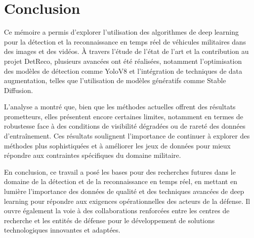 \chapter*{Conclusion}
\label{chap:conclusion}
\sloppy

Ce mémoire a permis d'explorer l'utilisation des algorithmes de deep learning pour la détection et la reconnaissance en temps réel de véhicules militaires dans des images et des vidéos.
À travers l'étude de l'état de l'art et la contribution au projet DetReco, plusieurs avancées ont été réalisées, notamment l'optimisation des modèles de détection comme YoloV8 et l'intégration de techniques de data augmentation, telles que l'utilisation de modèles génératifs comme Stable Diffusion.

L'analyse a montré que, bien que les méthodes actuelles offrent des résultats prometteurs, elles présentent encore certaines limites, notamment en termes de robustesse face à des conditions de visibilité dégradées ou de rareté des données d'entraînement.
Ces résultats soulignent l'importance de continuer à explorer des méthodes plus sophistiquées et à améliorer les jeux de données pour mieux répondre aux contraintes spécifiques du domaine militaire.

En conclusion, ce travail a posé les bases pour des recherches futures dans le domaine de la détection et de la reconnaissance en temps réel, en mettant en lumière l'importance des données de qualité et des techniques avancées de deep learning pour répondre aux exigences opérationnelles des acteurs de la défense.
Il ouvre également la voie à des collaborations renforcées entre les centres de recherche et les entités de défense pour le développement de solutions technologiques innovantes et adaptées.

